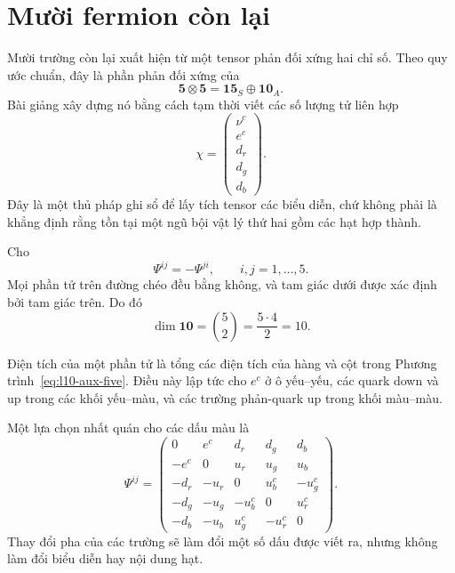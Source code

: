 \section{Mười fermion còn lại}

Mười trường còn lại xuất hiện từ một tensor phản đối xứng hai chỉ số. Theo quy ước chuẩn, đây là phần phản đối xứng của
\begin{equation}
\mathbf5\otimes\mathbf5
=\mathbf{15}_S\oplus\mathbf{10}_A.
\label{eq:l10-five-five}
\end{equation}
Bài giảng xây dựng nó bằng cách tạm thời viết các số lượng tử liên hợp
\begin{equation}
\chi=
\begin{pmatrix}
\nu^c\\
e^c\\
d_r\\
d_g\\
d_b
\end{pmatrix}.
\label{eq:l10-aux-five}
\end{equation}
Đây là một thủ pháp ghi sổ để lấy tích tensor các biểu diễn, chứ không phải là khẳng định rằng tồn tại một ngũ bội vật lý thứ hai gồm các hạt hợp thành.

Cho
\begin{equation}
\Psi^{ij}=-\Psi^{ji},
\qquad
i,j=1,\ldots,5.
\label{eq:l10-antisym-ten}
\end{equation}
Mọi phần tử trên đường chéo đều bằng không, và tam giác dưới được xác định bởi tam giác trên. Do đó
\begin{equation}
\dim\mathbf{10}
=\binom52
=\frac{5\cdot4}{2}
=10.
\label{eq:l10-ten-count}
\end{equation}

Điện tích của một phần tử là tổng các điện tích của hàng và cột trong Phương trình~\eqref{eq:l10-aux-five}. Điều này lập tức cho \(e^c\) ở ô yếu--yếu, các quark down và up trong các khối yếu--màu, và các trường phản-quark up trong khối màu--màu.

\begin{classroomqa}
\end{classroomqa}

Một lựa chọn nhất quán cho các dấu màu là
\begin{equation}
\Psi^{ij}=
\begin{pmatrix}
0 & e^c & d_r & d_g & d_b\\
-e^c & 0 & u_r & u_g & u_b\\
-d_r & -u_r & 0 & u_b^c & -u_g^c\\
-d_g & -u_g & -u_b^c & 0 & u_r^c\\
-d_b & -u_b & u_g^c & -u_r^c & 0
\end{pmatrix}.
\label{eq:l10-ten-matrix}
\end{equation}
Thay đổi pha của các trường sẽ làm đổi một số dấu được viết ra, nhưng không làm đổi biểu diễn hay nội dung hạt.

